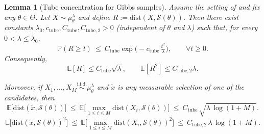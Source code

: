 \documentclass{article}
\theoremstyle{normaltheorem}
\newtheorem{lemma}[lemma]{Lemma}
\newcommand{\gibbs}{\mu}
\newcommand{\calS}{\mathcal{S}}
\begin{document}
\begin{lemma}[Tube concentration for Gibbs samples]\label{lem:gibbs-tube-width}
Assume the setting of  and fix any $\theta\in\Theta$.
Let $X\sim \gibbs_\theta^\lambda$ and define $R:=\mathrm{dist}(X,\calS(\theta))$.
Then there exist constants $\lambda_0,c_{\mathrm{tube}},C_{\mathrm{tube}},C_{\mathrm{tube},2}>0$ (independent of $\theta$ and $\lambda$) such that, for every \(0<\lambda\le\lambda_0\),
\begin{equation}\label{eq:gibbs-tail}
\mathbb P(R\ge t)\ \le\ C_{\mathrm{tube}}\exp\!\Big(-c_{\mathrm{tube}}\,\tfrac{t^2}{\lambda}\Big),
\qquad \forall t\ge 0.
\end{equation}
Consequently,
\[
\mathbb E[R]\le C_{\mathrm{tube}}\sqrt{\lambda},
\qquad
\mathbb E[R^2]\le C_{\mathrm{tube},2}\lambda.
\]

Moreover, if $X_1,\dots,X_M\stackrel{\mathrm{i.i.d.}}{\sim}\gibbs_\theta^\lambda$ and $\tilde x$ is any measurable selection of one of the candidates, then
\begin{equation}\label{eq:dist-tilde-max}
\mathbb E\big[\mathrm{dist}(\tilde x,\calS(\theta))\big]
\ \le\
\mathbb E\Big[\max_{1\le i\le M}\mathrm{dist}(X_i,\calS(\theta))\Big]
\ \le\
C_{\mathrm{tube}}\,\sqrt{\lambda\,\log(1+M)}.
\end{equation}
\begin{equation}\label{eq:dist-tilde-max2}
\mathbb E\big[\mathrm{dist}(\tilde x,\calS(\theta))^2\big]
\ \le\
\mathbb E\Big[\max_{1\le i\le M}\mathrm{dist}(X_i,\calS(\theta))^2\Big]
\ \le\
C_{\mathrm{tube},2}\,\lambda\,\log(1+M).
\end{equation}
\end{lemma}
\end{document}
